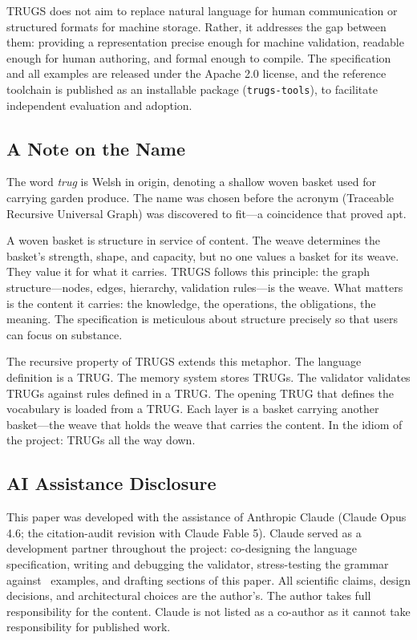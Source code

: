 \documentclass{article}
\begin{document}
TRUGS does not aim to replace natural language for human communication or structured formats for machine storage. Rather, it addresses the gap between them: providing a representation precise enough for machine validation, readable enough for human authoring, and formal enough to compile. The specification and all examples are released under the Apache 2.0 license, and the reference toolchain is published as an installable package (\texttt{trugs-tools}), to facilitate independent evaluation and adoption.

\subsection*{A Note on the Name}

The word \textit{trug} is Welsh in origin, denoting a shallow woven basket used for carrying garden produce. The name was chosen before the acronym (Traceable Recursive Universal Graph) was discovered to fit---a coincidence that proved apt.

A woven basket is structure in service of content. The weave determines the basket's strength, shape, and capacity, but no one values a basket for its weave. They value it for what it carries. TRUGS follows this principle: the graph structure---nodes, edges, hierarchy, validation rules---is the weave. What matters is the content it carries: the knowledge, the operations, the obligations, the meaning. The specification is meticulous about structure precisely so that users can focus on substance.

The recursive property of TRUGS extends this metaphor. The language definition is a TRUG. The memory system stores TRUGs. The validator validates TRUGs against rules defined in a TRUG. The opening TRUG that defines the vocabulary is loaded from a TRUG. Each layer is a basket carrying another basket---the weave that holds the weave that carries the content. In the idiom of the project: TRUGs all the way down.

\subsection*{AI Assistance Disclosure}

This paper was developed with the assistance of Anthropic Claude (Claude Opus 4.6; the citation-audit revision with Claude Fable 5). Claude served as a development partner throughout the project: co-designing the language specification, writing and debugging the validator, stress-testing the grammar against \ExamplesTotal\ examples, and drafting sections of this paper. All scientific claims, design decisions, and architectural choices are the author's. The author takes full responsibility for the content. Claude is not listed as a co-author as it cannot take responsibility for published work.
\end{document}
